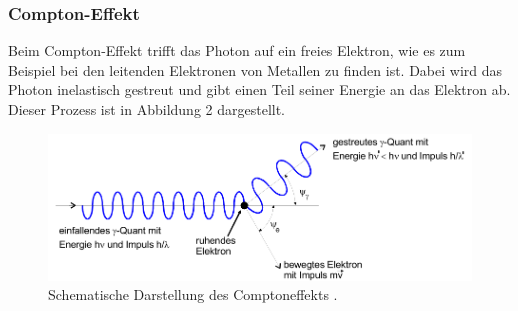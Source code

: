 \subsubsection{Compton-Effekt}
\label{sec:Compton-Effekt}
Beim Compton-Effekt trifft das Photon auf ein freies Elektron, wie es zum Beispiel bei den leitenden Elektronen
von Metallen zu finden ist. Dabei wird das Photon inelastisch gestreut und gibt einen Teil seiner Energie an das
Elektron ab. Dieser Prozess ist in Abbildung 2 dargestellt.
\begin{figure}
    \centering
    \label{fig:compton}
    \includegraphics[width=\textwidth]{Bilder/Compton.png}
    \caption{Schematische Darstellung des Comptoneffekts \cite{sample}.}
\end{figure}

